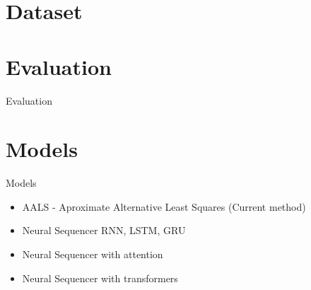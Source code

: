 \documentclass{beamer}
\begin{document}
\section{Dataset}

\section{Evaluation}
\begin{frame}{Evaluation}
    
\end{frame}
\section{Models}
\begin{frame}{Models}
\begin{itemize}
    \item AALS - Aproximate Alternative Least Squares (Current method)
    \item Neural Sequencer RNN, LSTM, GRU
    \item Neural Sequencer with attention
    \item Neural Sequencer with transformers
\end{itemize}
\end{frame}
\end{document}
